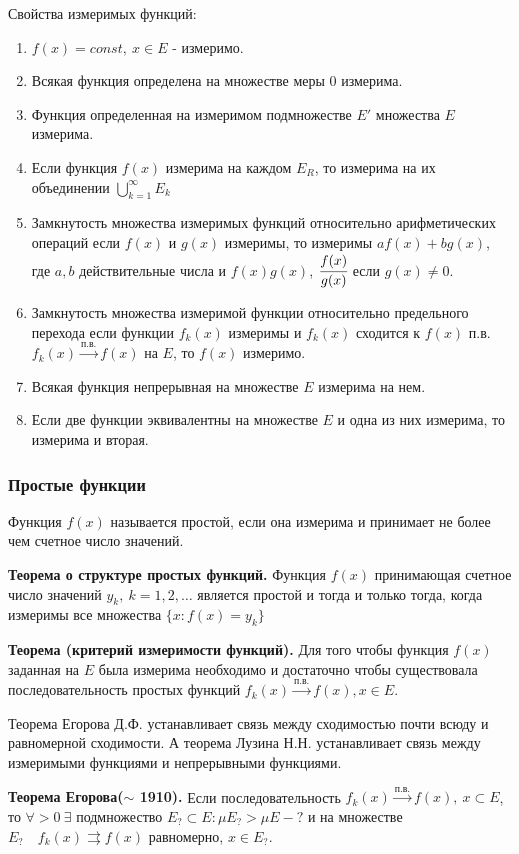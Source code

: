 \documentclass[14pt,a4paper]{extarticle}
\theoremstyle{definition}
\theoremstyle{remark}
\newcommand{\be}{\begin{enumerate}}
\newcommand{\ee}{\end{enumerate}}
\newcommand{\sep}{ , \ \allowbreak }
\renewcommand{\[}{\begin{dmath*}[compact]}
\renewcommand{\]}{\end{dmath*}}
\newcommand{\tth}[1][]{\textbf{Теорема#1.}}
\begin{document}
Свойства измеримых функций:

\be
  \item $f(x)=const \sep x \in E$ - измеримо.
  \item Всякая функция определена на множестве меры 0 измерима.
  \item Функция определенная на измеримом подмножестве $E'$ множества $E$ измерима.
  \item Если функция $f(x)$ измерима на каждом $E_R$, то измерима на их объединении $\bigcup _ {k=1}^\infty E_k$
  \item Замкнутость множества измеримых функций относительно арифметических операций если $f(x)$ и $g(x)$ измеримы, то измеримы $af(x)+ bg(x)$, где $a,b$ действительные числа и $f(x)g(x)$, $\cfrac{f(x)}{g(x)}$ если $g(x) \neq 0$.
  \item Замкнутость множества измеримой функции относительно предельного перехода если функции $f_k(x)$ измеримы и $f_k(x)$ сходится к $f(x)$ п.в. $f_k(x) \xrightarrow{п.в.} f(x)$ на $E$, то $f(x)$ измеримо.
  \item Всякая функция непрерывная на множестве $E$ измерима на нем.
  \item Если две функции эквивалентны на множестве $E$ и одна из них измерима, то измерима и вторая.
\ee

\subsubsection{Простые функции}

Функция $f(x)$ называется простой, если она измерима и принимает не более чем счетное число значений.

\tth[ о структуре простых функций] Функция $f(x)$ принимающая счетное число значений $y_k\sep k=1,2,\dots$ является простой и тогда и только тогда, когда измеримы все множества $\{x: f(x) = y_k \}$

\tth[ (критерий измеримости функций)] Для того чтобы функция $f(x)$ заданная на $E$ была измерима необходимо и достаточно чтобы существовала последовательность простых функций $f_k (x) \xrightarrow{\text{п.в.}} f(x), x \in E$.

Теорема Егорова Д.Ф. устанавливает связь между сходимостью почти всюду и равномерной сходимости. А теорема Лузина Н.Н. устанавливает связь между измеримыми функциями и непрерывными функциями.

\tth[ Егорова($\sim$ 1910)] Если последовательность $f_k(x) \xrightarrow{п.в.} f(x) \sep x \subset E$, то $\forall  > 0 \ \exists$ подмножество $ E_? \subset E : \mu E_? > \mu E - ? $ и на множестве $E_? \quad f_k(x) \rightrightarrows f(x)$ равномерно, $x \in E_?$.
\end{document}
